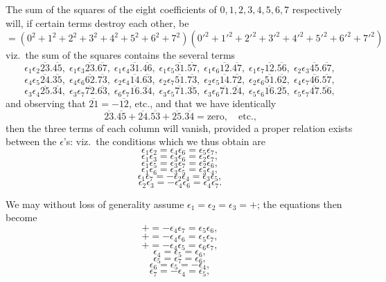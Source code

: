 \documentclass[11pt,a4paper]{article}
\begin{document}
The sum of the squares of the eight coefficients of $0,1,2,3,4,5,6,7$
respectively will, if certain terms destroy each other, be
\[
  =(0^{2}+1^{2}+2^{2}+3^{2}+4^{2}+5^{2}+6^{2}+7^{2})(0'^{2}+1'^{2}+2'^{2}+3'^{2}+4'^{2}+5'^{2}+6'^{2}+7'^{2})
\]
viz.\ the sum of the squares contains the several terms
\[
  \epsilon_{1}\epsilon_{2}\overline{23}.\overline{45},\;\epsilon_{1}\epsilon_{3}\overline{23}.\overline{67},\;\epsilon_{1}\epsilon_{4}\overline{31}.\overline{46},\;\epsilon_{1}\epsilon_{5}\overline{31}.\overline{57},\;\epsilon_{1}\epsilon_{6}\overline{12}.\overline{47},\;\epsilon_{1}\epsilon_{7}\overline{12}.\overline{56},\;\epsilon_{2}\epsilon_{3}\overline{45}.\overline{67},
\]
\[
  \epsilon_{4}\epsilon_{5}\overline{24}.\overline{35},\;\epsilon_{4}\epsilon_{6}\overline{62}.\overline{73},\;\epsilon_{2}\epsilon_{4}\overline{14}.\overline{63},\;\epsilon_{2}\epsilon_{7}\overline{51}.\overline{73},\;\epsilon_{2}\epsilon_{5}\overline{14}.\overline{72},\;\epsilon_{2}\epsilon_{6}\overline{51}.\overline{62},\;\epsilon_{4}\epsilon_{7}\overline{46}.\overline{57},
\]
\[
  \epsilon_{3}\epsilon_{4}\overline{25}.\overline{34},\;\epsilon_{3}\epsilon_{7}\overline{72}.\overline{63},\;\epsilon_{6}\epsilon_{7}\overline{16}.\overline{34},\;\epsilon_{3}\epsilon_{5}\overline{71}.\overline{35},\;\epsilon_{3}\epsilon_{6}\overline{71}.\overline{24},\;\epsilon_{5}\epsilon_{6}\overline{16}.\overline{25},\;\epsilon_{5}\epsilon_{7}\overline{47}.\overline{56},
\]
and observing that $\overline{21}=-\overline{12}$, etc., and that we have identically
\[
  \overline{23}.\overline{45}+\overline{24}.\overline{53}+\overline{25}.\overline{34}=\text{zero},\quad\text{etc.,}
\]
then the three terms of each column will vanish, provided a proper
relation exists between the $\epsilon$'s: viz.\ the conditions which we
thus obtain are
\[
  \epsilon_{1}\epsilon_{2}=\epsilon_{4}\epsilon_{6}=\epsilon_{5}\epsilon_{7},
\]
\[
  \epsilon_{1}\epsilon_{3}=\epsilon_{3}\epsilon_{6}=\epsilon_{2}\epsilon_{7},
\]
\[
  \epsilon_{1}\epsilon_{5}=\epsilon_{3}\epsilon_{7}=\epsilon_{2}\epsilon_{6},
\]
\[
  \epsilon_{1}\epsilon_{6}=\epsilon_{3}\epsilon_{5}=\epsilon_{3}\epsilon_{4},
\]
\[
  \epsilon_{1}\epsilon_{7}=-\epsilon_{2}\epsilon_{4}=\epsilon_{3}\epsilon_{5},
\]
\[
  \epsilon_{2}\epsilon_{3}=-\epsilon_{4}\epsilon_{6}=\epsilon_{4}\epsilon_{7}.
\]

We may without loss of generality assume $\epsilon_{1}=\epsilon_{2}=\epsilon_{3}=+$; the equations then become
\[
  +=-\epsilon_{4}\epsilon_{7}=\epsilon_{5}\epsilon_{6},
\]
\[
  +=-\epsilon_{4}\epsilon_{6}=\epsilon_{5}\epsilon_{7},
\]
\[
  +=-\epsilon_{4}\epsilon_{5}=\epsilon_{6}\epsilon_{7},
\]
\[
  \epsilon_{4}=\epsilon_{5}=\epsilon_{6},
\]
\[
  \epsilon_{5}=\epsilon_{7}=\epsilon_{6},
\]
\[
  \epsilon_{6}=\epsilon_{5}=-\epsilon_{4},
\]
\[
  \epsilon_{7}=-\epsilon_{4}=\epsilon_{5},
\]
\end{document}
